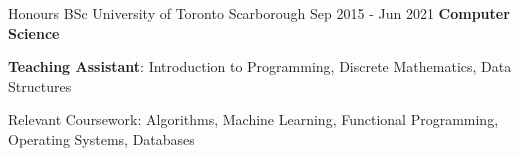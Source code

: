 
\begin{cventries}
  \cventry
    {Honours BSc}
    {University of Toronto}
    {Scarborough}
    {Sep 2015 - Jun 2021}
    {\textbf{Computer Science}}
    {
      \begin{cvitems}
        \item {\textbf{Teaching Assistant}: Introduction to Programming, Discrete Mathematics, Data Structures}
        \item {Relevant Coursework: Algorithms, Machine Learning, Functional Programming, Operating Systems, Databases}
      \end{cvitems}
    }
\end{cventries}
